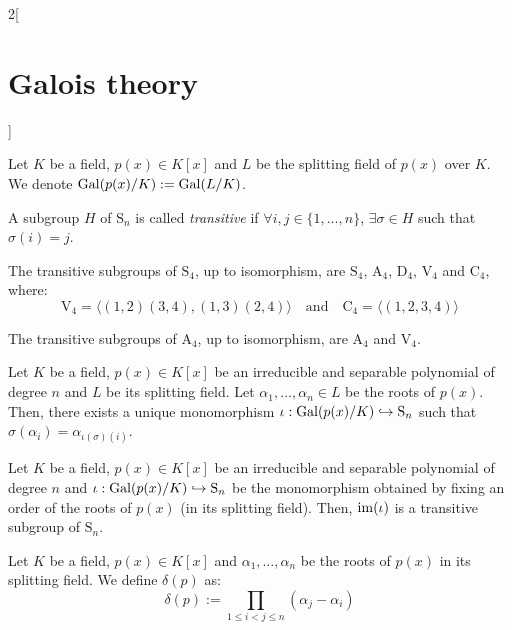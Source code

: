 \documentclass[../../../main.tex]{subfiles}
\begin{document}
\begin{multicols}{2}[\section{Galois theory}]
  \begin{center}
    \begin{minipage}{\linewidth}
      \centering
      
    \end{minipage}
  \end{center}
  \begin{definition}
    Let $K$ be a field, $p(x)\in K[x]$ and $L$ be the splitting field of $p(x)$ over $K$. We denote $\Gal(\quot{p(x)}{K}):=\Gal(\quot{L}{K})$.
  \end{definition}
  \begin{definition}
    A subgroup $H$ of $\text{S}_n$ is called \emph{transitive} if $\forall i,j\in\{1,\ldots,n\}$, $\exists \sigma\in H$ such that $\sigma(i)=j$.
  \end{definition}
  \begin{lemma}
    The transitive subgroups of $\text{S}_4$, up to isomorphism, are $\text{S}_4$, $\text{A}_4$, $\text{D}_4$, $\text{V}_4$ and $\text{C}_4$, where:
    $$\text{V}_4=\langle (1,2)(3,4),(1,3)(2,4)\rangle\quad\text{and}\quad \text{C}_4=\langle(1,2,3,4)\rangle$$
  \end{lemma}
  \begin{corollary}
    The transitive subgroups of $\text{A}_4$, up to isomorphism, are $\text{A}_4$ and $\text{V}_4$.
  \end{corollary}
  \begin{lemma}
    Let $K$ be a field, $p(x)\in K[x]$ be an irreducible and separable polynomial of degree $n$ and $L$ be its splitting field. Let $\alpha_1,\ldots,\alpha_n\in L$ be the roots of $p(x)$. Then, there exists a unique monomorphism $\iota: \Gal(\quot{p(x)}{K})\hookrightarrow \text{S}_n$ such that $\sigma(\alpha_i)=\alpha_{\iota(\sigma)(i)}$.
  \end{lemma}
  \begin{lemma}
    Let $K$ be a field, $p(x)\in K[x]$ be an irreducible and separable polynomial of degree $n$ and $\iota: \Gal(\quot{p(x)}{K})\hookrightarrow \text{S}_n$ be the monomorphism obtained by fixing an order of the roots of $p(x)$ (in its splitting field). Then, $\operatorname{im}(\iota)$ is a transitive subgroup of $\text{S}_n$.
  \end{lemma}
  \begin{definition}
    Let $K$ be a field, $p(x)\in K[x]$ and $\alpha_1,\ldots,\alpha_n$ be the roots of $p(x)$ in its splitting field. We define $\delta(p)$ as: $$\delta(p):=\prod_{1\leq i<j\leq n}(\alpha_j-\alpha_i)$$

\end{definition}
\end{multicols}
\end{document}
